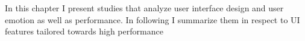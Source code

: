 
In this chapter I present studies that analyze user interface design and user emotion as well as performance. In following I summarize them in respect to UI features tailored towards high performance

